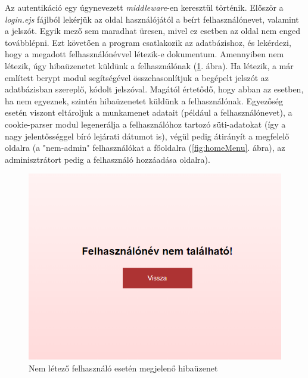 \newpage

Az autentikáció egy úgynevezett \textit{middleware}-en keresztül történik. Először a \textit{login.ejs} fájlból lekérjük az oldal használójától a beírt felhasználónevet, valamint a jelszót. Egyik mező sem maradhat üresen, mivel ez esetben az oldal nem enged továbblépni. Ezt követően a program csatlakozik az adatbázishoz, és lekérdezi, hogy a megadott felhasználónévvel létezik-e dokumentum. Amennyiben nem létezik, úgy hibaüzenetet küldünk a felhasználónak (\ref{fig:loginError}. ábra). Ha létezik, a már említett bcrypt modul segítségével összehasonlítjuk a begépelt jelszót az adatbázisban szereplő, kódolt jelszóval. Magától értetődő, hogy abban az esetben, ha nem egyeznek, szintén hibaüzenetet küldünk a felhasználónak. Egyezőség esetén viszont eltároljuk a munkamenet adatait (például a felhasználónevet), a cookie-parser modul legenerálja a felhasználóhoz tartozó süti-adatokat (így a nagy jelentősséggel bíró lejárati dátumot is), végül pedig átirányít a megfelelő oldalra (a "nem-admin" felhasználókat a főoldalra (\ref{fig:homeMenu}. ábra), az adminisztrátort pedig a felhasználó hozzáadása oldalra).

\begin{figure}[h]
	\centering
		\includegraphics[width=10truecm, height=7truecm]{images/nincs_felhasznalo.png}
	\caption{Nem létező felhasználó esetén megjelenő hibaüzenet}
	\label{fig:loginError}
\end{figure}

